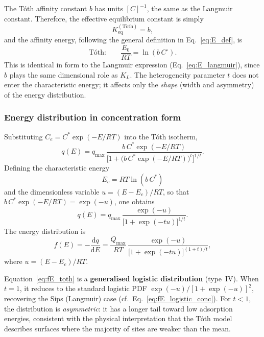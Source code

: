 \documentclass[12pt]{article}
\begin{document}
	The T\'oth affinity constant $b$ has units $[C]^{-1}$, the same as the
	Langmuir constant. Therefore, the effective equilibrium constant is
	simply
	\begin{equation}
		K_{\mathrm{eq}}^{\mathrm{(T\acute{o}th)}} = b,
	\end{equation}
	and the affinity energy, following the general definition in
	Eq.~\eqref{eq:E_def}, is
	\begin{equation}
		\text{T\'oth:}\qquad
		\frac{E_0}{RT} = \ln(b\,C^\circ).
		\label{eq:E_toth}
	\end{equation}
	This is identical in form to the Langmuir expression
	(Eq.~\eqref{eq:E_langmuir}), since $b$ plays the same dimensional role
	as $K_L$. The heterogeneity parameter $t$ does not enter the
	characteristic energy; it affects only the \emph{shape} (width and
	asymmetry) of the energy distribution.

	\subsubsection{Energy distribution in concentration form}

	Substituting $C_e = C^{\ast}\exp(-E/RT)$ into the T\'oth isotherm,
	\begin{equation}
		q(E) = q_{\max}\,
		\frac{b\,C^{\ast}\exp(-E/RT)}
		{\bigl[1 + \bigl(b\,C^{\ast}\exp(-E/RT)\bigr)^{t}\bigr]^{1/t}}.
	\end{equation}
	Defining the characteristic energy
	\begin{equation}
		E_c = RT\ln(b\,C^{\ast})
	\end{equation}
	and the dimensionless variable $u = (E - E_c)/RT$, so that
	$b\,C^{\ast}\exp(-E/RT) = \exp(-u)$, one obtains
	\begin{equation}
		q(E) = q_{\max}\,
		\frac{\exp(-u)}
		{\bigl[1 + \exp(-tu)\bigr]^{1/t}}.
		\label{eq:qE_toth}
	\end{equation}
	The energy distribution is
	\begin{equation}
		f(E) = -\frac{\mathrm{d}q}{\mathrm{d}E}
		= \frac{Q_{\max}}{RT}\,
		\frac{\exp(-u)}
		{\bigl[1 + \exp(-tu)\bigr]^{(1+t)/t}},
		\label{eq:fE_toth}
	\end{equation}
	where $u = (E - E_c)/RT$.

	Equation~\eqref{eq:fE_toth} is a \textbf{generalised logistic
	distribution} (type~IV). When $t = 1$, it reduces to the standard
	logistic PDF $\exp(-u)/[1+\exp(-u)]^2$, recovering the Sips
	(Langmuir) case (cf.\ Eq.~\eqref{eq:fE_logistic_conc}). For $t < 1$,
	the distribution is \emph{asymmetric}: it has a longer tail toward low
	adsorption energies, consistent with the physical interpretation that
	the T\'oth model describes surfaces where the majority of sites are
	weaker than the mean.
\end{document}
